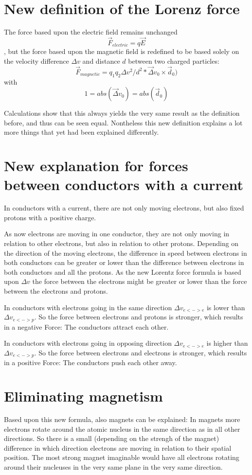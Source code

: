 \documentclass[12pt,a4paper,twocolumn]{article}
\begin{document}
\section{New definition of the Lorenz force}
The force based upon the electric field remains unchanged $$\vec{F}_{electric}=q\vec{E}$$, but the force based upon the magnetic field is redefined to be based solely on the velocity difference $\Delta v$ and distance $d$ between two charged particles: $$\vec{F}_{magnetic}=q_1 q_2 {\Delta v^2} / d^2 * {\vec\Delta v_0 \times \vec d_0)}$$  with $$1=abs(\vec \Delta v_0)=abs(\vec d_0)$$

Calculations show that this always yields the very same result as the definition before, and thus can be seen equal. Nontheless this new definition explains a lot more things that yet had been explained differently.

\section{New explanation for forces between conductors with a current}
In conductors with a current, there are not only moving electrons, but also fixed protons with a positive charge.

As now electrons are moving in one conductor, they are not only moving in relation to other electrons, but also in relation to other protons. Depending on the direction of the moving electrons, the difference in speed between electrons in both conductors can be greater or lower than the difference between electrons in both conductors and all the protons. As the new Lorentz force formula is based upon $\Delta v$ the force between the electrons might be greater or lower than the force between the electrons and protons.

In conductors with electrons going in the same direction $\Delta v_{e<->e}$ is lower than $\Delta v_{e<->p}$. So the force between electrons and protons is stronger, which results in a negative Force: The conductors attract each other.

In conductors with electrons going in opposing direction $\Delta v_{e<->e}$ is higher than $\Delta v_{e<->p}$. So the force between electrons and electrons is stronger, which results in a positive Force: The conductors push each other away.

\section{Eliminating magnetism}
Based upon this new formula, also magnets can be explained: In magnets more electrons rotate around the atomic nucleus in the same direction as in all other directions. So there is a small (depending on the strengh of the magnet) difference in which direction electrons are moving in relation to their spatial position. The most strong magnet imaginable would have all electrons rotating around their nucleuses in the very same plane in the very same direction.
\end{document}
